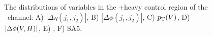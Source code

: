 \begin{figure}[htbp]
{    
  }
  \caption[Additional \bosZ+heavy Control Region Distributions for the \ZnnH\ Channel]{The distributions of variables in the \bosZ+heavy control region of the \ZnnH\ channel: A) $\left| \Delta \eta (j_{1}, j_{2}) \right|$, B) $\left| \Delta \phi (j_{1}, j_{2}) \right|$, C) $p_{\mathrm{T}}(V)$, D) $\left| \Delta \phi (V, H) \right|$, E) \pTmiss, F) SA5.}
  \label{fig:CR_Znn_ZHF_2}
\end{figure}

\clearpage


